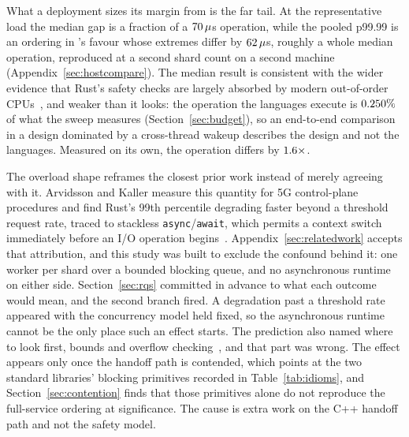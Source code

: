 \documentclass[english,oneside,a4paper,censored,csm,software-track-2020]{HYthesisML}
\begin{document}
What a deployment sizes its margin from is the far tail. At the representative load the median gap
is a fraction of a $70\,\mu$s operation, while the pooled p99.99 is an ordering in
\FarTailLower{}'s favour whose extremes differ by $62\,\mu$s, roughly a whole median
operation, reproduced at a second shard count on a second machine
(Appendix~\ref{sec:hostcompare}). The median result is consistent with the wider evidence that
Rust's safety checks are largely absorbed by modern out-of-order
CPUs~\cite{balasubramanian2017rust,emmerich2019drivers}, and weaker than it looks: the operation
the languages execute is $0.250\%$ of what the sweep measures
(Section~\ref{sec:budget}), so an end-to-end comparison in a design dominated by a cross-thread
wakeup describes the design and not the languages. Measured on its own, the operation differs by
$1.6\times$.

The overload shape reframes the closest prior work instead of merely agreeing with it. Arvidsson
and Kaller measure this quantity for 5G control-plane procedures and find Rust's 99th percentile
degrading faster beyond a threshold request rate, traced to stackless
\texttt{async}/\texttt{await}, which permits a context switch immediately before an I/O operation
begins~\cite{arvidsson2025async}. Appendix~\ref{sec:relatedwork} accepts that attribution, and this
study was built to exclude the confound behind it: one worker per shard over a bounded blocking
queue, and no asynchronous runtime on either side. Section~\ref{sec:rqs} committed in advance to
what each outcome would mean, and the second branch fired. A degradation past a threshold rate
appeared with the concurrency model held fixed, so the asynchronous runtime cannot be the only
place such an effect starts. The prediction also named where to look first, bounds and overflow
checking~\cite{zhang2022runtime,harris2023morello}, and that part was wrong. The effect appears
only once the handoff path is contended, which points at the two standard libraries' blocking
primitives recorded in Table~\ref{tab:idioms}, and Section~\ref{sec:contention} finds that those
primitives alone do not reproduce the full-service ordering at significance. The cause is extra
work on the C++ handoff path and not the safety model.
\end{document}
